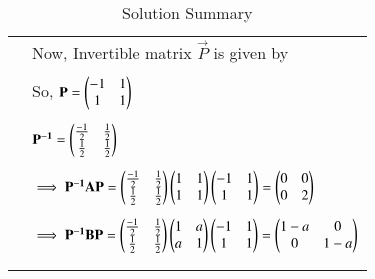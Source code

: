 \documentclass[journal,12pt]{IEEEtran}
\begin{document}
\begin{longtable}{|c|l|}
	&  Now, Invertible matrix $\vec{P}$ is given by\\
	&\\
	& So, $\mathbf{P} = \begin{pmatrix}-1&1\\1&1\end{pmatrix}$\\
	&\\
	& $\mathbf{P^{-1}} = \begin{pmatrix}\frac{-1}{2}&\frac{1}{2}\\ \frac {1}{2}&\frac{1}{2}\end{pmatrix} $\\
	&\\
	& $\implies \mathbf{P^{-1}AP}=\begin{pmatrix}\frac{-1}{2}&\frac{1}{2}\\ \frac {1}{2}&\frac{1}{2}\end{pmatrix} \begin{pmatrix}1&1\\1&1\end{pmatrix} \begin{pmatrix}-1&1\\1&1\end{pmatrix} = \begin{pmatrix}0&0\\0&2\end{pmatrix}$\\
	&\\
	& $\implies \mathbf{P^{-1}BP}=\begin{pmatrix}\frac{-1}{2}&\frac{1}{2}\\ \frac {1}{2}&\frac{1}{2}\end{pmatrix} \begin{pmatrix}1&a\\a&1\end{pmatrix} \begin{pmatrix}-1&1\\1&1\end{pmatrix} = \begin{pmatrix}1-a&0\\0&1-a\end{pmatrix}$\\
	&\\
	\hline
	\caption{Solution Summary}
    \label{table:2}
\end{longtable}
\end{document}
